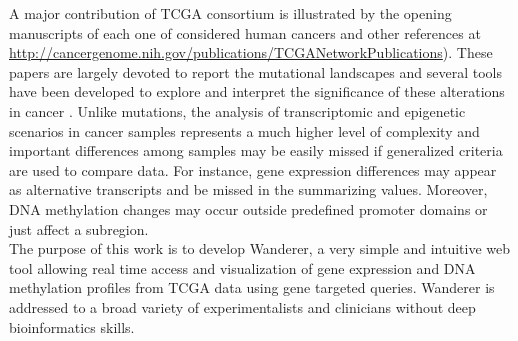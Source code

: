 \documentclass{bmcart}
\begin{document}
A major contribution of TCGA consortium is illustrated by the opening manuscripts of each one of considered human cancers \cite{weinstein2013cancer} and other references at \url{http://cancergenome.nih.gov/publications/TCGANetworkPublications}). These papers are largely devoted to report the mutational landscapes and several tools have been developed to explore and interpret the significance of these alterations in cancer \cite{gonzalez2013intogen}. Unlike mutations, the analysis of transcriptomic and epigenetic scenarios in cancer samples represents a much higher level of complexity and important differences among samples may be easily missed if generalized criteria are used to compare data. For instance, gene expression differences may appear as alternative transcripts and be missed in the summarizing values. Moreover, DNA methylation changes may occur outside predefined promoter domains or just affect a subregion.\\ 

The purpose of this work is to develop Wanderer, a very simple and intuitive web tool allowing real time access and visualization of gene expression and DNA methylation profiles from TCGA data using gene targeted queries. Wanderer is addressed to a broad variety of experimentalists and clinicians without deep bioinformatics skills.\\       
  





\end{document}
